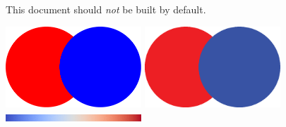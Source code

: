 \documentclass{article}
\begin{document}
\Large
\noindent
This document should \emph{\Huge not} be built by default.

\includegraphics[width=2in]{images/Circles_pdf}
\includegraphics[width=2in]{images/Circles_eps}
\includegraphics[width=2in]{images/Cool2WarmBar}
\end{document}
